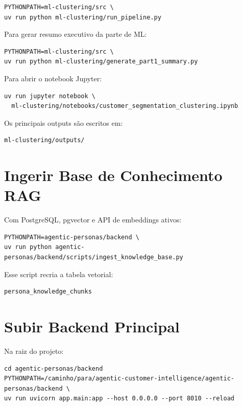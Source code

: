 \documentclass[12pt,a4paper]{article}
\begin{document}
\begin{verbatim}
PYTHONPATH=ml-clustering/src \
uv run python ml-clustering/run_pipeline.py
\end{verbatim}

Para gerar resumo executivo da parte de ML:

\begin{verbatim}
PYTHONPATH=ml-clustering/src \
uv run python ml-clustering/generate_part1_summary.py
\end{verbatim}

Para abrir o notebook Jupyter:

\begin{verbatim}
uv run jupyter notebook \
  ml-clustering/notebooks/customer_segmentation_clustering.ipynb
\end{verbatim}

Os principais outputs são escritos em:

\begin{verbatim}
ml-clustering/outputs/
\end{verbatim}

\section{Ingerir Base de Conhecimento RAG}

Com PostgreSQL, pgvector e API de embeddings ativos:

\begin{verbatim}
PYTHONPATH=agentic-personas/backend \
uv run python agentic-personas/backend/scripts/ingest_knowledge_base.py
\end{verbatim}

Esse script recria a tabela vetorial:

\begin{verbatim}
persona_knowledge_chunks
\end{verbatim}

\section{Subir Backend Principal}

Na raiz do projeto:

\begin{verbatim}
cd agentic-personas/backend
PYTHONPATH=/caminho/para/agentic-customer-intelligence/agentic-personas/backend \
uv run uvicorn app.main:app --host 0.0.0.0 --port 8010 --reload
\end{verbatim}
\end{document}
